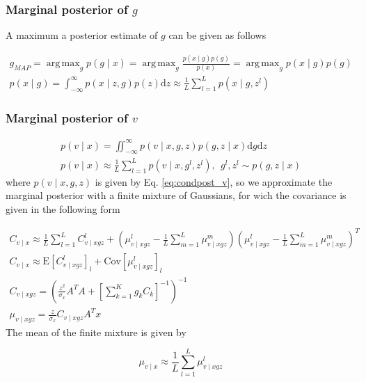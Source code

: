 \documentclass{paper}
\DeclareMathOperator*{\argmax}{arg\,max}
\begin{document}
\subsubsection{Marginal posterior of $g$}

A maximum a posterior estimate of $g$ can be given as follows

\begin{eqnarray}
g_{MAP} = \argmax_g p(g \mid x) = \argmax_g \frac{p(x \mid g)p(g)}{p(x)} = \argmax_g p(x \mid g)p(g)\\
p(x \mid g) = \int_{-\infty}^{\infty} p(x \mid z,g)p(z)\mathrm{d}z \approx \frac{1}{L} \sum_{l=1}^{L} p(x \mid g,z^l)
\end{eqnarray}


\subsubsection{Marginal posterior of $v$}

\begin{eqnarray}
p(v \mid x) = \iint_{-\infty}^\infty p(v \mid x,g,z) p(g,z \mid x) \mathrm{d}g \mathrm{d}z \\
p(v \mid x) \approx \frac{1}{L} \sum_{l=1}^L p(v \mid x,g^l,z^l), ~~ g^l, z^l \sim p(g,z \mid x)
\end{eqnarray}
%
where $p(v \mid x,g,z)$ is given by Eq. \ref{eq:condpost_v}, so we approximate the marginal posterior with a finite mixture of Gaussians, for wich the covariance is given in the following form

\begin{eqnarray}
C_{v \mid x} \approx \frac{1}{L} \sum_{l=1}^L C_{v \mid xgz}^l + ( \mu_{v \mid xgz}^l - \frac{1}{L} \sum_{m=1}^L \mu_{v \mid xgz}^m) ( \mu_{v \mid xgz}^l - \frac{1}{L} \sum_{m=1}^L \mu_{v \mid xgz}^m)^T \\
C_{v \mid x} \approx \mathrm{E} \left[ C_{v \mid xgz}^l \right]_l + \mathrm{Cov} \left[\mu_{v \mid xgz}^l \right]_l \\
C_{v \mid xgz} =  \left(\frac{z^2}{\sigma_x} A^T A + \left[\sum_{k=1}^K g_k C_k \right]^{-1}\right)^{-1} \\
\mu_{v \mid xgz} = \frac{z}{\sigma_x} C_{v \mid xgz} A^T x
\end{eqnarray}
%
The mean of the finite mixture is given by

\begin{equation}
\mu_{v \mid x} \approx \frac{1}{L} \sum_{l=1}^L \mu_{v \mid xgz}^l
\end{equation}
\end{document}

